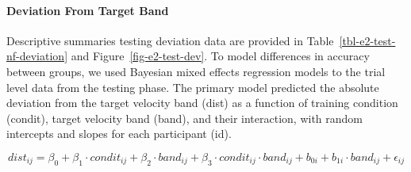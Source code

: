 \documentclass[
  letterpaper,
  DIV=11,
  numbers=noendperiod,
  oneside]{scrartcl}
\let\oldparagraph\paragraph
\renewcommand{\paragraph}[1]{\oldparagraph{#1}\mbox{}}
\begin{document}
\paragraph{Deviation From Target
Band}\label{deviation-from-target-band-1}

Descriptive summaries testing deviation data are provided in
Table~\ref{tbl-e2-test-nf-deviation} and Figure~\ref{fig-e2-test-dev}.
To model differences in accuracy between groups, we used Bayesian mixed
effects regression models to the trial level data from the testing
phase. The primary model predicted the absolute deviation from the
target velocity band (dist) as a function of training condition
(condit), target velocity band (band), and their interaction, with
random intercepts and slopes for each participant (id).

\begin{equation}
dist_{ij} = \beta_0 + \beta_1 \cdot condit_{ij} + \beta_2 \cdot band_{ij} + \beta_3 \cdot condit_{ij} \cdot band_{ij} + b_{0i} + b_{1i} \cdot band_{ij} + \epsilon_{ij}
\end{equation}
\end{document}
